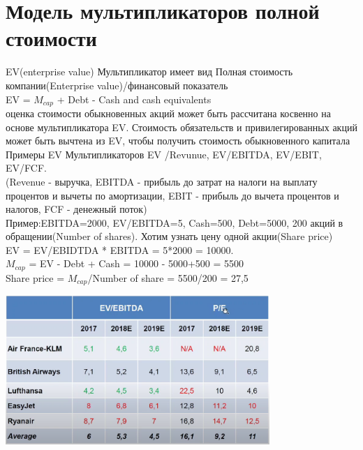 \documentclass{article}
\begin{document}
\section{Модель мультипликаторов полной стоимости}
EV(enterprise value) Мультипликатор имеет вид Полная стоимость компании(Enterprise value)/финансовый показатель\\
EV = $M_{cap}$ + Debt - Cash and cash equivalents \\
оценка стоимости обыкновенных акций может быть рассчитана косвенно на основе мультипликатора EV.
  Стоимость обязательств и привилегированных акций может быть вычтена из EV, чтобы получить стоимость обыкновенного капитала\\
  Примеры EV Мультипликаторов EV /Revunue, EV/EBITDA, EV/EBIT, EV/FCF.\\
  (Revenue - выручка, EBITDA - прибыль до затрат на налоги на выплату процентов и вычеты по амортизации, EBIT -  прибыль до вычета процентов и налогов, FCF - денежный поток)\\
  Пример:EBITDA=2000, EV/EBITDA=5, Cash=500, Debt=5000, 200 акций в обращении(Number of shares). Хотим узнать цену одной акции(Share price)\\
  EV = EV/EBIDTDA * EBITDA = 5*2000 = 10000.\\
  $M_{cap}$ = EV - Debt + Cash = 10000 - 5000+500 = 5500\\
  Share price = $M_{cap}$/Number of share = 5500/200 = 27,5\\
\begin{center}
\includegraphics[width=0.75\textwidth]{EV_multiple.png}\\
\end{center}
\newpage
\end{document}
